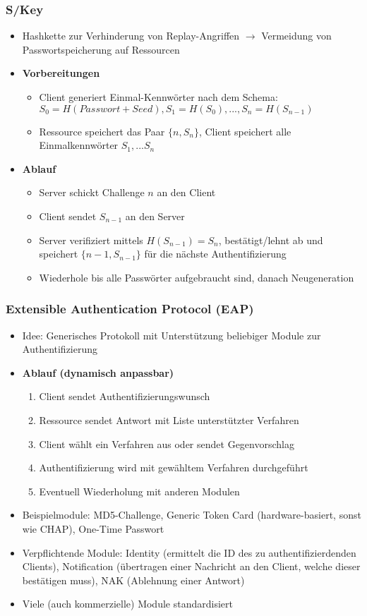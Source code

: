 \subsubsection{S/Key}
\begin{itemize}
	\item Hashkette zur Verhinderung von Replay-Angriffen \(\rightarrow\) Vermeidung von Passwortspeicherung auf Ressourcen
	\item \textbf{Vorbereitungen}
	\begin{itemize}
		\item Client generiert Einmal-Kennwörter nach dem Schema: \(S_0=H(Passwort+Seed),S_1=H(S_0),...,S_n=H(S_{n-1})\)
		\item Ressource speichert das Paar \(\{n,S_n\}\), Client speichert alle Einmalkennwörter \(S_1,...S_n\)
	\end{itemize}
	\item \textbf{Ablauf}
	\begin{itemize}
		\item Server schickt Challenge \(n\) an den Client
		\item Client sendet \(S_{n-1}\) an den Server
		\item Server verifiziert mittels \(H(S_{n-1})=S_n\), bestätigt/lehnt ab und speichert \(\{n-1,S_{n-1}\}\) für die nächste Authentifizierung
		\item Wiederhole bis alle Passwörter aufgebraucht sind, danach Neugeneration
	\end{itemize}
\end{itemize}

\subsubsection{Extensible Authentication Protocol (EAP)}
\begin{itemize}
	\item Idee: Generisches Protokoll mit Unterstützung beliebiger Module zur Authentifizierung
	\item \textbf{Ablauf (dynamisch anpassbar)}
	\begin{enumerate}
		\item Client sendet Authentifizierungswunsch
		\item Ressource sendet Antwort mit Liste unterstützter Verfahren
		\item Client wählt ein Verfahren aus oder sendet Gegenvorschlag
		\item Authentifizierung wird mit gewähltem Verfahren durchgeführt
		\item Eventuell Wiederholung mit anderen Modulen
	\end{enumerate}
	\item Beispielmodule: MD5-Challenge, Generic Token Card (hardware-basiert, sonst wie CHAP), One-Time Passwort
	\item Verpflichtende Module: Identity (ermittelt die ID des zu authentifizierdenden Clients), Notification (übertragen einer Nachricht an den Client, welche dieser bestätigen muss), NAK (Ablehnung einer Antwort)
	\item Viele (auch kommerzielle) Module standardisiert
\end{itemize}


